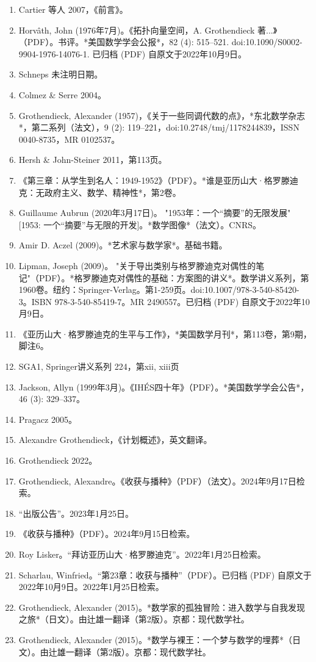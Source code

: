 \begin{enumerate}
\item Cartier 等人 2007，《前言》。  
\item Horvâth, John (1976年7月)。《拓扑向量空间，A. Grothendieck 著...》（PDF）。书评。*美国数学学会公报*，82 (4): 515–521. doi:10.1090/S0002-9904-1976-14076-1. 已归档 (PDF) 自原文于2022年10月9日。  
\item Schneps 未注明日期。  
\item Colmez & Serre 2004。  
\item Grothendieck, Alexander (1957)，《关于一些同调代数的点》，*东北数学杂志*，第二系列（法文），9 (2): 119–221，doi:10.2748/tmj/1178244839，ISSN 0040-8735，MR 0102537。  
\item Hersh & John-Steiner 2011，第113页。  
\item 《第三章：从学生到名人：1949-1952》（PDF）。*谁是亚历山大·格罗滕迪克：无政府主义、数学、精神性*，第2卷。  
\item Guillaume Aubrun (2020年3月17日)。 "1953年：一个“摘要”的无限发展" [1953: 一个“摘要”与无限的开发]。*数学图像*（法文）。CNRS。  
\item Amir D. Aczel (2009)。*艺术家与数学家*。基础书籍。  
\item Lipman, Joseph (2009)。 "关于导出类别与格罗滕迪克对偶性的笔记"（PDF）。*格罗滕迪克对偶性的基础：方案图的讲义*。数学讲义系列，第1960卷。纽约：Springer-Verlag。第1-259页。doi:10.1007/978-3-540-85420-3。ISBN 978-3-540-85419-7。MR 2490557。已归档 (PDF) 自原文于2022年10月9日。  
\item 《亚历山大·格罗滕迪克的生平与工作》，*美国数学月刊*，第113卷，第9期，脚注6。
\item SGA1, Springer讲义系列 224，第xii, xiii页  
\item Jackson, Allyn (1999年3月)。《IHÉS四十年》（PDF）。*美国数学学会公告*，46 (3): 329–337。  
\item Pragacz 2005。  
\item Alexandre Grothendieck，《计划概述》，英文翻译。  
\item Grothendieck 2022。  
\item Grothendieck, Alexandre。《收获与播种》（PDF）（法文）。2024年9月17日检索。  
\item “出版公告”。2023年1月25日。  
\item 《收获与播种》（PDF）。2024年9月15日检索。  
\item Roy Lisker。“拜访亚历山大·格罗滕迪克”。2022年1月25日检索。  
\item Scharlau, Winfried。“第23章：收获与播种”（PDF）。已归档 (PDF) 自原文于2022年10月9日。2022年1月25日检索。  
\item Grothendieck, Alexander (2015)。*数学家的孤独冒险：进入数学与自我发现之旅*（日文）。由辻雄一翻译（第2版）。京都：现代数学社。  
\item Grothendieck, Alexander (2015)。*数学与裸王：一个梦与数学的埋葬*（日文）。由辻雄一翻译（第2版）。京都：现代数学社。
\end{enumerate}